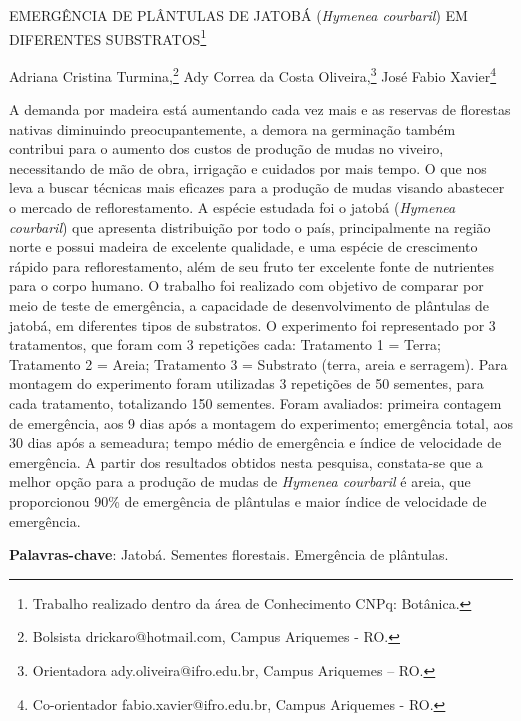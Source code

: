 \documentclass[article,12pt,onesidea,4paper,english,brazil]{abntex2}
\begin{document}
	
	
	\frenchspacing 
	
	\begin{center}
		\LARGE EMERGÊNCIA DE PLÂNTULAS DE JATOBÁ (\textit{Hymenea courbaril}) EM
		DIFERENTES SUBSTRATOS\footnote{Trabalho realizado dentro da área de Conhecimento CNPq: Botânica.}
		
		\normalsize
		Adriana Cristina Turmina,\footnote{Bolsista drickaro@hotmail.com, Campus Ariquemes - RO.} 
		Ady Correa da Costa Oliveira,\footnote{Orientadora ady.oliveira@ifro.edu.br, Campus Ariquemes – RO.} 
	José Fabio Xavier\footnote{Co-orientador fabio.xavier@ifro.edu.br, Campus Ariquemes - RO.} 
	
	\end{center}
	
	\noindent A demanda por madeira está aumentando cada vez mais e as reservas de florestas
	nativas diminuindo preocupantemente, a demora na germinação também contribui para o aumento dos custos de produção de mudas no viveiro, necessitando de mão de obra, irrigação e cuidados por mais tempo. O que nos leva a buscar técnicas mais eficazes para a produção de mudas visando abastecer o mercado de reflorestamento. A espécie estudada foi o jatobá (\textit{Hymenea courbaril}) que apresenta distribuição por todo o país, principalmente na região norte e possui madeira de excelente qualidade, e uma espécie de crescimento rápido para reflorestamento, além de seu fruto ter excelente fonte de nutrientes para o corpo humano. O trabalho foi realizado com objetivo de comparar por meio de teste de emergência, a capacidade de desenvolvimento de plântulas de jatobá, em diferentes tipos de substratos. O experimento foi representado por 3 tratamentos, que foram com 3 repetições cada: Tratamento 1 = Terra; Tratamento 2 = Areia; Tratamento 3 = Substrato (terra, areia e serragem). Para montagem do experimento foram utilizadas 3 repetições de 50 sementes, para cada tratamento, totalizando 150 sementes.
	Foram avaliados: primeira contagem de emergência, aos 9 dias após a montagem do experimento; emergência total, aos 30 dias após a semeadura; tempo médio de
	emergência e índice de velocidade de emergência. A partir dos resultados obtidos nesta pesquisa, constata-se que a melhor opção para a produção de mudas de \textit{Hymenea courbaril} é areia, que proporcionou 90\% de emergência de plântulas e maior índice de velocidade de emergência.
	
	\vspace{\onelineskip}
	
	\noindent
	\textbf{Palavras-chave}: Jatobá. Sementes florestais. Emergência de plântulas.
	
\end{document}
